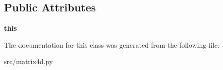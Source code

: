 \subsection*{Public Attributes}
\begin{DoxyCompactItemize}
\item 
\hypertarget{classmatrix4d_1_1Matrix4D_a874437e826daf81e59bd8dad0fb64f00}{
{\bfseries this}}
\label{d8/d2d/classmatrix4d_1_1Matrix4D_a874437e826daf81e59bd8dad0fb64f00}

\end{DoxyCompactItemize}


The documentation for this class was generated from the following file:\begin{DoxyCompactItemize}
\item 
src/matrix4d.py\end{DoxyCompactItemize}
